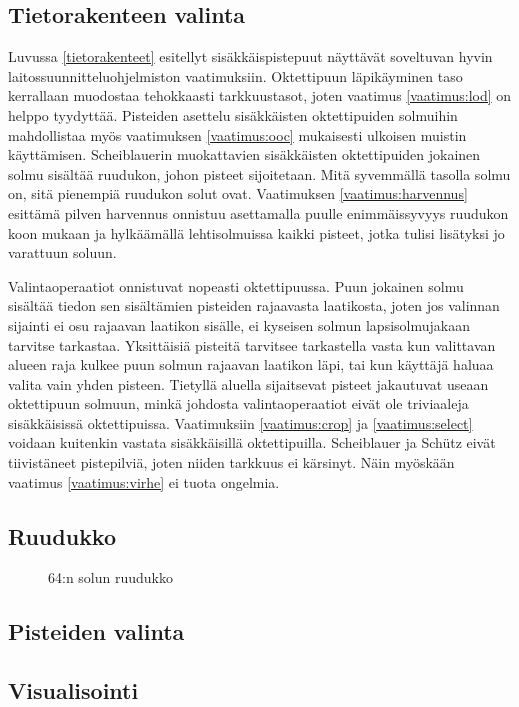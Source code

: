\subsection{Tietorakenteen valinta}

Luvussa \ref{tietorakenteet} esitellyt sisäkkäispistepuut näyttävät soveltuvan hyvin laitossuunnitteluohjelmiston vaatimuksiin. Oktettipuun läpikäyminen taso kerrallaan muodostaa tehokkaasti tarkkuustasot, joten vaatimus \ref{vaatimus:lod} on helppo tyydyttää. Pisteiden asettelu sisäkkäisten oktettipuiden solmuihin mahdollistaa myös vaatimuksen \ref{vaatimus:ooc} mukaisesti ulkoisen muistin käyttämisen. Scheiblauerin muokattavien sisäkkäisten oktettipuiden jokainen solmu sisältää ruudukon, johon pisteet sijoitetaan. Mitä syvemmällä tasolla solmu on, sitä pienempiä ruudukon solut ovat. Vaatimuksen \ref{vaatimus:harvennus} esittämä pilven harvennus onnistuu asettamalla puulle enimmäissyvyys ruudukon koon mukaan ja hylkäämällä lehtisolmuissa kaikki pisteet, jotka tulisi lisätyksi jo varattuun soluun. 

Valintaoperaatiot onnistuvat nopeasti oktettipuussa. Puun jokainen solmu sisältää tiedon sen sisältämien pisteiden rajaavasta laatikosta, joten jos valinnan sijainti ei osu rajaavan laatikon sisälle, ei kyseisen solmun lapsisolmujakaan tarvitse tarkastaa. Yksittäisiä pisteitä tarvitsee tarkastella vasta kun valittavan alueen raja kulkee puun solmun rajaavan laatikon läpi, tai kun käyttäjä haluaa valita vain yhden pisteen. Tietyllä aluella sijaitsevat pisteet jakautuvat useaan oktettipuun solmuun, minkä johdosta valintaoperaatiot eivät ole triviaaleja sisäkkäisissä oktettipuissa. Vaatimuksiin \ref{vaatimus:crop} ja \ref{vaatimus:select} voidaan kuitenkin vastata sisäkkäisillä oktettipuilla. Scheiblauer ja Schütz eivät tiivistäneet pistepilviä, joten niiden tarkkuus ei kärsinyt. Näin myöskään vaatimus \ref{vaatimus:virhe} ei tuota ongelmia.


\subsection{Ruudukko}
\begin{figure}
    
    \caption{64:n solun ruudukko}
    \label{ruudukkokuva}
\end{figure}

\subsection{Pisteiden valinta}

\subsection{Visualisointi}
